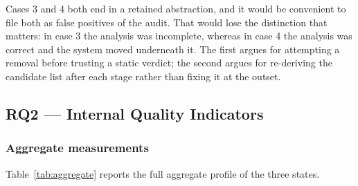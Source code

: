 \documentclass[pdflatex,sn-basic]{sn-jnl}
\begin{document}
Cases 3 and 4 both end in a retained abstraction, and it would be convenient to file both as false positives of the audit. That would lose the distinction that matters: in case 3 the analysis was incomplete, whereas in case 4 the analysis was correct and the system moved underneath it. The first argues for attempting a removal before trusting a static verdict; the second argues for re-deriving the candidate list after each stage rather than fixing it at the outset.

\subsection{RQ2 --- Internal Quality Indicators}\label{sec:rq2}

\subsubsection{Aggregate measurements}

Table~\ref{tab:aggregate} reports the full aggregate profile of the three states.
\end{document}
